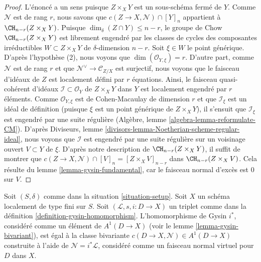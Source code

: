 \begin{proof}
L'énoncé a un sens puisque $Z \times_X Y$ est un sous-schéma fermé de $Y$.
Comme $\mathcal{N}$ est de rang $r$, nous savons que
$c(Z \to X, \mathcal{N}) \cap [Y]_n$ appartient à $\CH_{n - r}(Z \times_X Y)$.
Puisque $\dim_\delta(Z \cap Y) \leq n - r$, le groupe de Chow
$\CH_{n - r}(Z \times_X Y)$ est librement engendré par les
classes de cycles des composantes irréductibles $W \subset Z \times_X Y$
de $\delta$-dimension $n - r$. Soit $\xi \in W$ le point générique.
D'après l'hypothèse (2), nous voyons que $\dim(\mathcal{O}_{Y, \xi}) = r$.
D'autre part, comme $\mathcal{N}$ est de rang $r$ et que
$\mathcal{N}^\vee \to \mathcal{C}_{Z/X}$ est surjectif, nous voyons que
le faisceau d'idéaux de $Z$ est localement défini par $r$ équations.
Ainsi, le faisceau quasi-cohérent d'idéaux $\mathcal{I} \subset \mathcal{O}_Y$
de $Z \times_X Y$ dans $Y$ est localement engendré par $r$ éléments.
Comme $\mathcal{O}_{Y, \xi}$ est de Cohen-Macaulay de dimension $r$
et que $\mathcal{I}_\xi$ est un idéal de définition (puisque $\xi$ est
un point générique de $Z \times_X Y$), il s'ensuit que $\mathcal{I}_\xi$
est engendré par une suite régulière
(Algèbre, lemme \ref{algebra-lemma-reformulate-CM}).
D'après Diviseurs, lemme \ref{divisors-lemma-Noetherian-scheme-regular-ideal},
nous voyons que $\mathcal{I}$ est engendré par une suite régulière sur
un voisinage ouvert $V \subset Y$ de $\xi$. D'après notre description de
$\CH_{n - r}(Z \times_X Y)$, il suffit de montrer que
$c(Z \to X, \mathcal{N}) \cap [V]_n = [Z \times_X V]_{n - r}$
dans $\CH_{n - r}(Z \times_X V)$. Cela résulte du
lemme \ref{lemma-gysin-fundamental},
car le faisceau normal d'excès est $0$ sur $V$.
\end{proof}

\begin{lemma}
\label{lemma-gysin-agrees}
Soit $(S, \delta)$ comme dans la situation \ref{situation-setup}. Soit $X$ un schéma
localement de type fini sur $S$. Soit $(\mathcal{L}, s, i : D \to X)$
un triplet comme dans la définition \ref{definition-gysin-homomorphism}.
L'homomorphisme de Gysin $i^*$, considéré comme un élément de $A^1(D \to X)$
(voir le lemme \ref{lemma-gysin-bivariant}), est égal à la classe bivariante
$c(D \to X, \mathcal{N}) \in A^1(D \to X)$
construite à l'aide de $\mathcal{N} = i^*\mathcal{L}$,
considéré comme un faisceau normal virtuel pour $D$ dans $X$.
\end{lemma}

